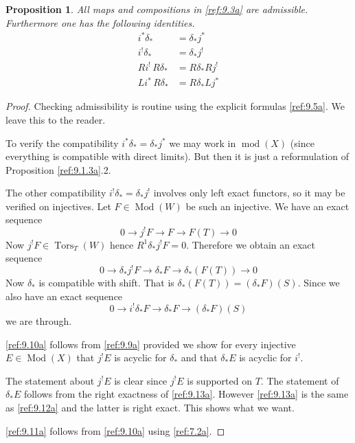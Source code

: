 \documentclass{amsproc}
\def\Tors{\operatorname{Tors}}
\def\coh{\operatorname {mod}}
\def\Tors{\operatorname {Tors}}
\def\Qch{\operatorname {Mod}}
\def\r{\rightarrow}
\newtheorem{propositions}[lemmas]{Proposition}
\theoremstyle{definition}
\theoremstyle{remark}
\numberwithin{equation}{section}
\numberwithin{table}{section}
\numberwithin{figure}{section}
\begin{document}
\begin{propositions} 
\label{ref:9.1.8a}
All maps and compositions  in \eqref{ref:9.3a} are
  admissible. Furthermore one has the following identities.
\begin{align}
i^\ast\delta_\ast&=\delta_\ast j^\ast\\
\label{ref:9.9a}
i^!\delta_\ast&=\delta_\ast j^!\\
\label{ref:9.10a}
Ri^!\,R\delta_\ast&= R\delta_\ast Rj^!\\
\label{ref:9.11a}
Li^\ast\, R\delta_\ast &= R\delta_\ast Lj^\ast
\end{align}
\end{propositions}
\begin{proof}
Checking admissibility is routine using the explicit formulas
\eqref{ref:9.5a}. We leave this to the reader.


To verify the compatibility $i^\ast\delta_\ast=\delta_\ast j^\ast$ we
may work in $\coh(X)$ (since everything is compatible with direct
limits). But then it is just a reformulation of Proposition
\ref{ref:9.1.3a}.2.

The other compatibility $i^!\delta_\ast=\delta_\ast j^!$ involves only
left exact functors, so it may be verified on injectives. Let $F\in
\Qch(W)$ be such an injective. We have an exact sequence
\[
0\r j^! F\r F \r F(T) \r 0
\]
Now $j^! F\in \Tors_T(W)$ hence $R^1\delta_\ast j^!
F=0$. 
Therefore we obtain an exact sequence
\begin{equation}
\label{ref:9.12a}
0\r \delta_\ast j^! F\r \delta_\ast F \r \delta_\ast (F(T)) \r 0
\end{equation}
Now $\delta_\ast$ is compatible with shift. That is $\delta_\ast
(F(T))=(\delta_\ast F)(S)$.
Since we also have an exact sequence
\begin{equation}
\label{ref:9.13a}
0\r i^!\delta_\ast F\r \delta_\ast F\r (\delta_\ast F)(S)
\end{equation}
we are through.





\eqref{ref:9.10a} follows from \eqref{ref:9.9a} provided we show for every
injective $E\in \Qch(X)$ that $j^!E$ is acyclic for $\delta_\ast$
and that $\delta_\ast E$ is acyclic for $i^!$. 

The statement about $j^!E$ is clear since $j^!E$ is supported on
$T$. The statement of $\delta_\ast E$ follows from the right exactness
of \eqref{ref:9.13a}. However \eqref{ref:9.13a} is the same as \eqref{ref:9.12a} and the
latter is right exact. This shows what we want.


\eqref{ref:9.11a} follows from \eqref{ref:9.10a} using \eqref{ref:7.2a}.
\end{proof}
\end{document}
